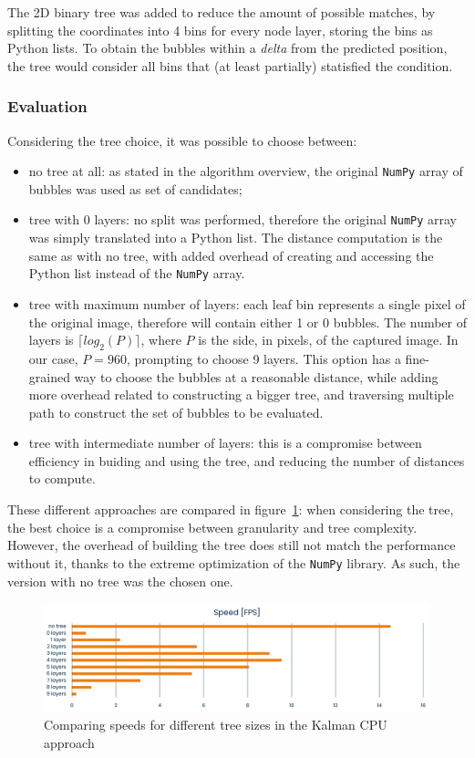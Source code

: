 The 2D binary tree was added to reduce the amount of possible matches, by splitting the coordinates into 4 bins for every node layer, storing the bins as Python lists.
To obtain the bubbles within a \textit{delta} from the predicted position, the tree would consider all bins that (at least partially) statisfied the condition.

\subsubsection{Evaluation}

Considering the tree choice, it was possible to choose between:
\begin{itemize}
	\itemsep 0em
	\item no tree at all: as stated in the algorithm overview, the original \texttt{NumPy} array of bubbles was used as set of candidates;
	\item tree with 0 layers: no split was performed, therefore the original \texttt{NumPy} array was simply translated into a Python list. The distance computation is the same as with no tree, with added overhead of creating and accessing the Python list instead of the \texttt{NumPy} array.
	\item tree with maximum number of layers: each leaf bin represents a single pixel of the original image, therefore will contain either 1 or 0 bubbles. The number of layers is $\lceil log_2(P) \rceil$, where $P$ is the side, in pixels, of the captured image. In our case, $P{=}960$, prompting to choose 9 layers. This option has a fine-grained way to choose the bubbles at a reasonable distance, while adding more overhead related to constructing a bigger tree, and traversing multiple path to construct the set of bubbles to be evaluated.
	\item tree with intermediate number of layers: this is a compromise between efficiency in buiding and using the tree, and reducing the number of distances to compute.
\end{itemize}
These different approaches are compared in figure~\ref{fig:linkDD:kalmancpu:speed-cmp}: when considering the tree, the best choice is a compromise between granularity and tree complexity.
However, the overhead of building the tree does still not match the performance without it, thanks to the extreme optimization of the \texttt{NumPy} library.
As such, the version with no tree was the chosen one.

\begin{figure}
	\centerline{\includegraphics[width=\locateimgsize]{images/link-2dtree-speeds.png}}
	\caption{\centering Comparing speeds for different tree sizes in the Kalman CPU \linkDD* approach}
	\label{fig:linkDD:kalmancpu:speed-cmp}
\end{figure}

